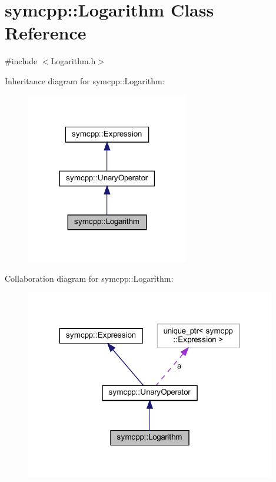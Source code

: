 \hypertarget{classsymcpp_1_1Logarithm}{}\section{symcpp\+::Logarithm Class Reference}
\label{classsymcpp_1_1Logarithm}


{\ttfamily \#include $<$Logarithm.\+h$>$}



Inheritance diagram for symcpp\+::Logarithm\+:
\nopagebreak
\begin{figure}[H]
\begin{center}
\leavevmode
\includegraphics[width=201pt]{classsymcpp_1_1Logarithm__inherit__graph}
\end{center}
\end{figure}


Collaboration diagram for symcpp\+::Logarithm\+:
\nopagebreak
\begin{figure}[H]
\begin{center}
\leavevmode
\includegraphics[width=310pt]{classsymcpp_1_1Logarithm__coll__graph}
\end{center}
\end{figure}
